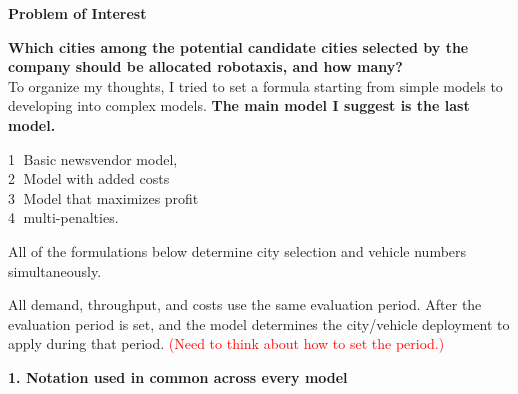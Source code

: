 \documentclass[10pt,a4paper]{article}
\newcommand{\hd}[1]{\par\vspace{8pt}\textbf{#1}\par\vspace{3pt}}
\newcommand{\circnum}[1]{\textcircled{\scriptsize #1}}
\begin{document}
\hd{Problem of Interest}
\textbf{Which cities among the potential candidate cities selected by the company should be allocated robotaxis, and how many?}\\

To organize my thoughts, I tried to set a formula starting from simple models to developing into complex models. \textbf{The main model I suggest is the last model.}

\circnum{1} Basic newsvendor model,\\
\circnum{2} Model with added costs\\
\circnum{3} Model that maximizes profit\\
\circnum{4} multi-penalties.

All of the formulations below determine city selection and vehicle numbers simultaneously.

All demand, throughput, and costs use the same evaluation period. After the evaluation period is set, and the model determines the city/vehicle deployment to apply during that period. \textcolor{red}{(Need to think about how to set the period.)}

\hd{1. Notation used in common across every model}
\end{document}
